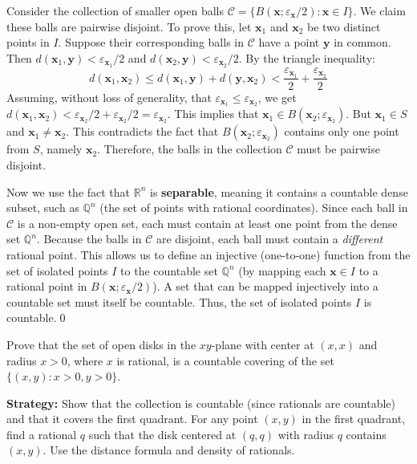 Consider the collection of smaller open balls $\mathcal{C} = \{ B(\mathbf{x}; \varepsilon_{\mathbf{x}}/2) : \mathbf{x} \in I \}$. We claim these balls are pairwise disjoint.
To prove this, let $\mathbf{x}_1$ and $\mathbf{x}_2$ be two distinct points in $I$. Suppose their corresponding balls in $\mathcal{C}$ have a point $\mathbf{y}$ in common. Then $d(\mathbf{x}_1, \mathbf{y}) < \varepsilon_{\mathbf{x}_1}/2$ and $d(\mathbf{x}_2, \mathbf{y}) < \varepsilon_{\mathbf{x}_2}/2$.
By the triangle inequality:
$$d(\mathbf{x}_1, \mathbf{x}_2) \le d(\mathbf{x}_1, \mathbf{y}) + d(\mathbf{y}, \mathbf{x}_2) < \frac{\varepsilon_{\mathbf{x}_1}}{2} + \frac{\varepsilon_{\mathbf{x}_2}}{2}$$
Assuming, without loss of generality, that $\varepsilon_{\mathbf{x}_1} \le \varepsilon_{\mathbf{x}_2}$, we get $d(\mathbf{x}_1, \mathbf{x}_2) < \varepsilon_{\mathbf{x}_2}/2 + \varepsilon_{\mathbf{x}_2}/2 = \varepsilon_{\mathbf{x}_2}$.
This implies that $\mathbf{x}_1 \in B(\mathbf{x}_2; \varepsilon_{\mathbf{x}_2})$. But $\mathbf{x}_1 \in S$ and $\mathbf{x}_1 \neq \mathbf{x}_2$. This contradicts the fact that $B(\mathbf{x}_2; \varepsilon_{\mathbf{x}_2})$ contains only one point from $S$, namely $\mathbf{x}_2$.
Therefore, the balls in the collection $\mathcal{C}$ must be pairwise disjoint.

Now we use the fact that $\mathbb{R}^n$ is \textbf{separable}, meaning it contains a countable dense subset, such as $\mathbb{Q}^n$ (the set of points with rational coordinates).
Since each ball in $\mathcal{C}$ is a non-empty open set, each must contain at least one point from the dense set $\mathbb{Q}^n$. Because the balls in $\mathcal{C}$ are disjoint, each ball must contain a \textit{different} rational point.
This allows us to define an injective (one-to-one) function from the set of isolated points $I$ to the countable set $\mathbb{Q}^n$ (by mapping each $\mathbf{x} \in I$ to a rational point in $B(\mathbf{x}; \varepsilon_{\mathbf{x}}/2)$). A set that can be mapped injectively into a countable set must itself be countable.
Thus, the set of isolated points $I$ is countable.\qed


\begin{problembox}
Prove that the set of open disks in the \(xy\)-plane with center at \( (x, x) \) and radius \( x > 0 \), where \( x \) is rational, is a countable covering of the set \( \{(x, y) : x > 0, y > 0\} \).
\end{problembox}

\noindent\textbf{Strategy:} Show that the collection is countable (since rationals are countable) and that it covers the first quadrant. For any point $(x,y)$ in the first quadrant, find a rational $q$ such that the disk centered at $(q,q)$ with radius $q$ contains $(x,y)$. Use the distance formula and density of rationals.

